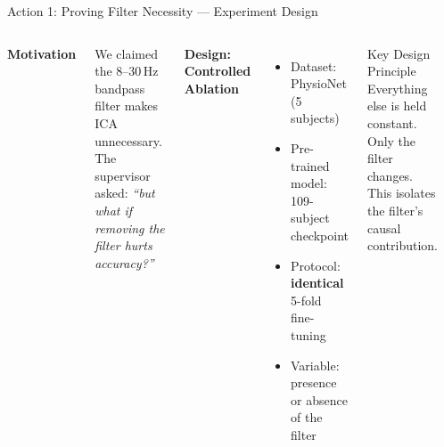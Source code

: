 \documentclass[aspectratio=169, 11pt]{beamer}
\begin{document}
\begin{frame}{Action 1: Proving Filter Necessity --- Experiment Design}

    \begin{columns}[T]
        \textbf{Motivation}
        
        \small We claimed the 8--30\,Hz bandpass filter makes ICA unnecessary. The supervisor asked: \textit{``but what if removing the filter hurts accuracy?''}

        \vspace{1mm}
        \normalsize\textbf{Design: Controlled Ablation}
        \begin{itemize}
            \item Dataset: PhysioNet (5 subjects)
            \item Pre-trained model: 109-subject checkpoint
            \item Protocol: \textbf{identical} 5-fold fine-tuning
            \item Variable: presence or absence of the filter
        \end{itemize}

        \vspace{1mm}
        \begin{exampleblock}{Key Design Principle}
            \footnotesize Everything else is held constant. Only the filter changes. This isolates the filter's causal contribution.
        \end{exampleblock}

        \begin{center}
\end{center}
\end{columns}
\end{frame}
\end{document}
